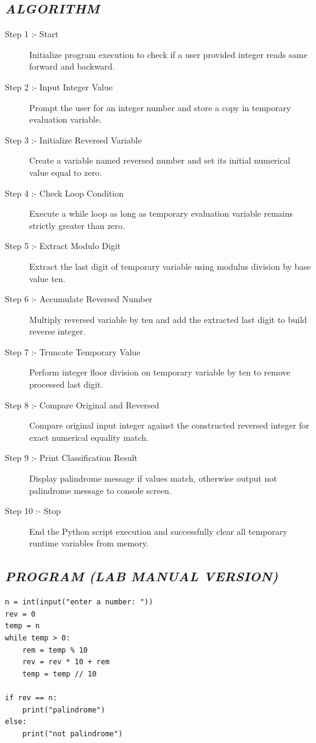 \documentclass[11pt,a4paper]{article}
\begin{document}
\subsection*{\textit{ALGORITHM}}
\begin{description}
  \item[Step 1 :- Start] Initialize program execution to check if a user provided integer reads same forward and backward.
  \item[Step 2 :- Input Integer Value] Prompt the user for an integer number and store a copy in temporary evaluation variable.
  \item[Step 3 :- Initialize Reversed Variable] Create a variable named reversed number and set its initial numerical value equal to zero.
  \item[Step 4 :- Check Loop Condition] Execute a while loop as long as temporary evaluation variable remains strictly greater than zero.
  \item[Step 5 :- Extract Modulo Digit] Extract the last digit of temporary variable using modulus division by base value ten.
  \item[Step 6 :- Accumulate Reversed Number] Multiply reversed variable by ten and add the extracted last digit to build reverse integer.
  \item[Step 7 :- Truncate Temporary Value] Perform integer floor division on temporary variable by ten to remove processed last digit.
  \item[Step 8 :- Compare Original and Reversed] Compare original input integer against the constructed reversed integer for exact numerical equality match.
  \item[Step 9 :- Print Classification Result] Display palindrome message if values match, otherwise output not palindrome message to console screen.
  \item[Step 10 :- Stop] End the Python script execution and successfully clear all temporary runtime variables from memory.
\end{description}

\subsection*{\textit{PROGRAM (LAB MANUAL VERSION)}}
\begin{lstlisting}[style=pythonstyle]
n = int(input("enter a number: ")) 
rev = 0 
temp = n 
while temp > 0: 
    rem = temp % 10 
    rev = rev * 10 + rem 
    temp = temp // 10 

if rev == n: 
    print("palindrome") 
else: 
    print("not palindrome")
\end{lstlisting}
\end{document}
